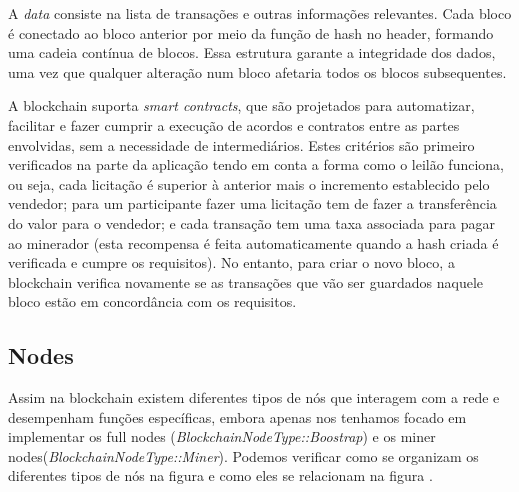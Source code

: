\documentclass[conference]{IEEEtran}
\begin{document}
    A \textit{data} consiste na lista de transações e outras informações relevantes.
    Cada bloco é conectado ao bloco anterior por meio da função de hash no header, formando uma cadeia contínua de blocos. Essa estrutura garante a integridade dos dados, uma vez que qualquer alteração num bloco afetaria todos os blocos subsequentes.

    A blockchain suporta \textit{smart contracts}, que são projetados para automatizar, facilitar e fazer cumprir a execução de acordos e contratos entre as partes envolvidas, sem a necessidade de intermediários. Estes critérios são primeiro verificados na parte da aplicação tendo em conta a forma como o leilão funciona, ou seja, cada licitação é superior à anterior mais o incremento establecido pelo vendedor; para um participante fazer uma licitação tem de fazer a transferência do valor para o vendedor; e cada transação tem uma taxa associada para pagar ao minerador (esta recompensa é feita automaticamente quando a hash criada é verificada e cumpre os requisitos). No entanto, para criar o novo bloco, a blockchain verifica novamente se as transações que vão ser guardados naquele bloco estão em concordância com os requisitos.

    \subsection{Nodes}
    Assim na blockchain existem diferentes tipos de nós que interagem com a rede e desempenham funções específicas, embora apenas nos tenhamos focado em implementar os full nodes (\textit{BlockchainNodeType::Boostrap}) e os miner  nodes(\textit{BlockchainNodeType::Miner}). Podemos verificar como se organizam os diferentes tipos de nós na figura \cite{3} e como eles se relacionam na figura \cite{4}.
\end{document}
